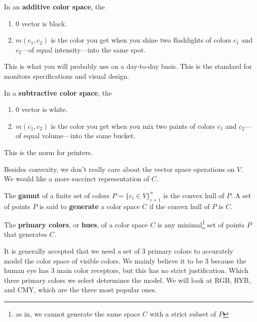 \begin{definition}
  \label{def:additive-color-space}
 
  In an \textbf{additive color space}, the 
  \begin{enumerate}
    \item $0$ vector is black. 
    \item $m(c_1, c_2)$ is the color you get when you shine two flashlights of colors $c_1$ and $c_2$---of equal intensity---into the same spot. 
  \end{enumerate}
  This is what you will probably use on a day-to-day basis. This is the standard for monitors specifications and visual design. 
\end{definition}

\begin{definition}
  \label{def:subtractive-color-space}
  In a \textbf{subtractive color space}, the 
  \begin{enumerate}
    \item $0$ vector is white. 
    \item $m(c_1, c_2)$ is the color you get when you mix two paints of colors $c_1$ and $c_2$---of equal volume---into the same bucket. 
  \end{enumerate} 
  This is the norm for printers. 
\end{definition} 

Besides convexity, we don't really care about the vector space operations on $V$. We would like a more succinct representation of $C$. 

\begin{definition}[Gamut]
  \label{def:gamut}
  The \textbf{gamut} of a finite set of colors $P = \{c_i \in V \}_{i=1}^n $ is the convex hull of $P$. A set of points $P$ is said to \textbf{generate} a color space $C$ if the convex hull of $P$ is $C$. 
\end{definition} 

\begin{definition}
  \label{def:primary-colors}
  The \textbf{primary colors}, or \textbf{hues}, of a color space $C$ is any minimal\footnote{as in, we cannot generate the same space $C$ with a strict subset of $P$} set of points $P$ that generates $C$. 
\end{definition}

It is generally accepted that we need a set of 3 primary colors to accurately model the color space of visible colors. We mainly believe it to be 3 because the human eye has 3 main color receptors, but this has no strict justification. Which three primary colors we select determines the model. We will look at RGB, RYB, and CMY, which are the three most popular ones. 

